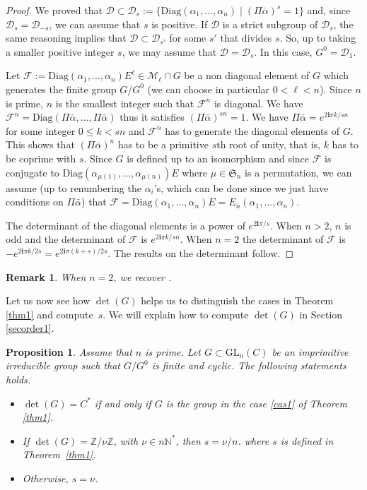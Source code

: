 \documentclass[a4paper,11pt]{amsart}
\renewcommand{\leq}{\leqslant}
\newtheorem{rem}[thm]{Remark}
\newtheorem{prop}[thm]{Proposition}
\def\baralp{\bar{\alpha}}
\def\Z{\mathbb{Z}}
\def\N{\mathbb{N}}
\begin{document}
\begin{proof}
We proved that $\mathcal{D}\subset \mathcal{D}_s:=\lbrace \mathrm{Diag}(\alpha_{1},\dots, \alpha_n)\mid (\Pi \overline{\alpha})^{s}=1\rbrace$ and, since $\mathcal{D}_{s}=\mathcal{D}_{-s}$, we can assume that $s$ is positive. If $\mathcal{D}$ is a strict subgroup of $\mathcal{D}_s$, the same reasoning implies that $\mathcal{D}\subset \mathcal{D}_{s'}$ for some $s'$ that divides $s$. So, up to taking a smaller positive integer $s$, we may assume that $\mathcal{D}= \mathcal{D}_s$.
In this case, $G^0=\mathcal{D}_1$.  
 
Let $\mathscr{F}:=\mathrm{Diag} (\alpha_{1},\dots, \alpha_n)E^{\ell}\in \mathcal{M}_{\ell}\cap G$ be a non diagonal element of $G$ which generates the finite group $G/G^0$ (we can choose in particular $0<\ell<n$). Since $n$ is prime, $n$ is the smallest integer such that $\mathscr{F}^n$ is diagonal. We have $\mathscr{F}^n = \mathrm{Diag} (\Pi \baralp ,\dots, \Pi \baralp)$ thus it satisfies $(\Pi \baralp)^{sn}=1$. We have $\Pi \baralp=e^{2\mathbf{i}\pi k/sn}$ for some integer $0\leq k<sn$ and $\mathscr{F}^n$ has to generate the diagonal elements of $G$. This shows that $(\Pi \baralp)^n$ has to be a primitive $s$th root of unity, that is, $k$ has to be coprime with $s$. Since $G$ is defined up to an isomorphism and since $\mathscr{F}$ is conjugate to $\mathrm{Diag} (\alpha_{\mu(1)},\dots, \alpha_{\mu(n)})E$ where $\mu\in\mathfrak{S}_n$ is a permutation, we can assume (up to renumbering the $\alpha_i$'s, which can be done since we just have conditions on $\Pi \baralp$) that $\mathscr{F} = \mathrm{Diag} (\alpha_{1},\dots, \alpha_n)E = E_n\left(\alpha_{1},\dots, \alpha_n\right)$.\par 
The determinant of the diagonal elements is a power of $e^{2\mathbf{i}\pi/s}$. When $n>2$, $n$ is odd and the determinant of $\mathscr{F}$ is $e^{2\mathbf{i}\pi k/sn}$. When $n=2$ the determinant of $\mathscr{F}$ is  $-e^{2\mathbf{i}\pi k/2s}=e^{2\mathbf{i}\pi (k+s)/2s}$.   
The results on the determinant  follow.
\end{proof}


\begin{rem}
When $n=2$, we recover \cite[Lemma 4.8]{hendriks1998algorithm}.
\end{rem}

Let us now see how $\det(G)$ helps us to distinguish the cases in Theorem \ref{thm1} and compute~$s$. We will explain how to compute $\det(G)$ in Section \ref{secorder1}. 

\begin{prop}
\label{prop:detDistinguish}
Assume that $n$ is prime.  Let $G \subset \mathrm{GL}_n (C)$ be an imprimitive irreducible group such that $G/G^{0}$ is finite and cyclic.  The following statements holds.
\begin{itemize}
\item  $\det(G)=C^*$ if and only if  $G$ is the group  in the case \ref{cas1} of Theorem \ref{thm1}.   
\item If  $\det(G)=\Z/  \nu \Z$, with $\nu \in n\N^*$,  then $s=\nu/n$. where $s$ is defined in  Theorem~\ref{thm1}.
\item Otherwise,  $s=\nu$. 
\end{itemize}
\end{prop}
\end{document}
